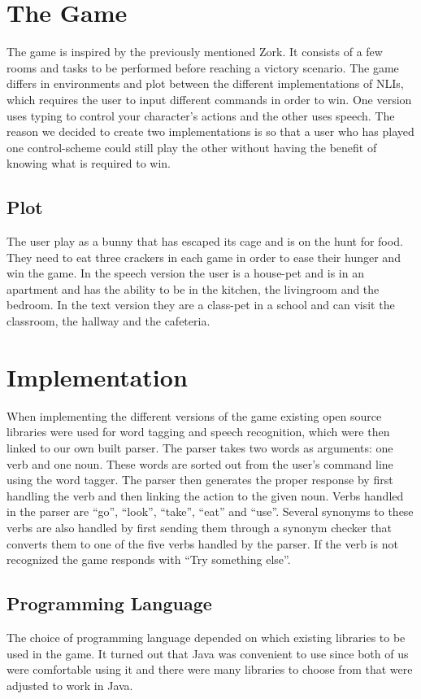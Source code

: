 \section{The Game}
The game is inspired by the previously mentioned Zork. It consists of a few rooms and tasks to be performed before reaching a victory scenario. The game differs in environments and plot between the different implementations of NLIs, which requires the user to input different commands in order to win. One version uses typing to control your character’s actions and the other uses speech. The reason we decided to create two implementations is so that a user who has played one control-scheme could still play the other without having the benefit of knowing what is required to win.

\subsection{Plot}
The user play as a bunny that has escaped its cage and is on the hunt for food. They need to eat three crackers in each game in order to ease their hunger and win the game. In the speech version the user is a house-pet and is in an apartment and has the ability to be in the kitchen, the livingroom and the bedroom. In the text version they are a class-pet in a school and can visit the classroom, the hallway and the cafeteria.

\section{Implementation}
When implementing the different versions of the game existing open source libraries were used for word tagging and speech recognition, which were then linked to our own built parser. The parser takes two words as arguments: one verb and one noun. These words are sorted out from the user's command line using the word tagger. The parser then generates the proper response by first handling the verb and then linking the action to the given noun. Verbs handled in the parser are ``go'', ``look'', ``take'', ``eat'' and ``use''. Several synonyms to these verbs are also handled by first sending them through a synonym checker that converts them to one of the five verbs handled by the parser. If the verb is not recognized the game responds with ``Try something else''.

\subsection{Programming Language}
The choice of programming language depended on which existing libraries to be used in the game. It turned out that Java was convenient to use since both of us were comfortable using it and there were many libraries to choose from that were adjusted to work in Java.

